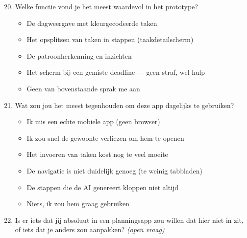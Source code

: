 \begin{enumerate}
  \setcounter{enumi}{19}
  \item Welke functie vond je het meest waardevol in het prototype?
  \begin{itemize}
    \item De dagweergave met kleurgecodeerde taken
    \item Het opsplitsen van taken in stappen (taakdetailscherm)
    \item De patroonherkenning en inzichten
    \item Het scherm bij een gemiste deadline --- geen straf, wel hulp
    \item Geen van bovenstaande sprak me aan
  \end{itemize}
  \item Wat zou jou het meest tegenhouden om deze app dagelijks te
  gebruiken?
  \begin{itemize}
    \item Ik mis een echte mobiele app (geen browser)
    \item Ik zou snel de gewoonte verliezen om hem te openen
    \item Het invoeren van taken kost nog te veel moeite
    \item De navigatie is niet duidelijk genoeg (te weinig tabbladen)
    \item De stappen die de AI genereert kloppen niet altijd
    \item Niets, ik zou hem graag gebruiken
  \end{itemize}
  \item Is er iets dat jij absoluut in een planningsapp zou willen dat hier
  niet in zit, of iets dat je anders zou aanpakken? \textit{(open vraag)}
\end{enumerate}
